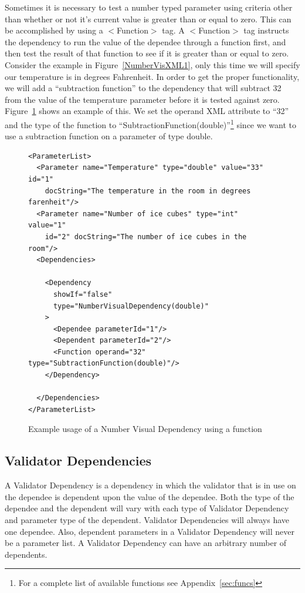 Sometimes it is necessary to test a number typed parameter using criteria other than whether or not it's current value is greater than or equal to zero.
This can be accomplished by using a $<$Function$>$ tag. A $<$Function$>$ tag instructs the dependency to run the value of the dependee through a function
first, and then test the result of that function to see if it is greater than or equal to zero. Consider the example in Figure~\ref{NumberVisXML1}, only this
time we will specify our temperature is in degrees Fahrenheit. In order to get the proper functionality, we will add a ``subtraction function'' to the dependency that will
subtract 32 from the value of the temperature parameter before it is tested against zero. Figure~\ref{NumberVisXML2} shows an example of this. We set the operand 
XML attribute to ``32'' and the type of the function to ``SubtractionFunction(double)''\footnote{For a complete list of available functions see Appendix~\ref{sec:funcs}}
 since we want to use a subtraction function on a parameter of type double.
\begin{figure}
\centering
{\footnotesize
\begin{verbatim}
<ParameterList>
  <Parameter name="Temperature" type="double" value="33" id="1" 
    docString="The temperature in the room in degrees farenheit"/>
  <Parameter name="Number of ice cubes" type="int" value="1"
    id="2" docString="The number of ice cubes in the room"/>
  <Dependencies>

    <Dependency 
      showIf="false" 
      type="NumberVisualDependency(double)"
    >
      <Dependee parameterId="1"/>
      <Dependent parameterId="2"/>
      <Function operand="32" type="SubtractionFunction(double)"/> 
    </Dependency>

  </Dependencies>
</ParameterList>
\end{verbatim}
}
\caption{Example usage of a Number Visual Dependency using a function}
\label{NumberVisXML2}
\end{figure}

\subsection{Validator Dependencies}
A Validator Dependency is a dependency in which the validator that is in use on the dependee is dependent upon the value of the dependee. Both the type of
the dependee and the dependent will vary with each type of Validator Dependency and parameter type of the dependent. Validator Dependencies will always have
one dependee. Also, dependent parameters in a Validator Dependency will never be a parameter list. A Validator Dependency can have an arbitrary number of 
dependents.

